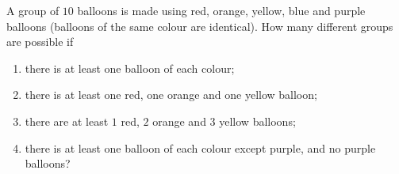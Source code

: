 A group of $10$ balloons is made using red, orange, yellow, blue and purple balloons (balloons of the same colour are identical). How many different groups are possible if
\begin{enumerate}
\item[(a)] there is at least one balloon of each colour;
\item[(b)] there is at least one red, one orange and one yellow balloon;
\item[(c)] there are at least $1$ red, $2$ orange and $3$ yellow balloons;
\item[(d)] there is at least one balloon of each colour except purple, and no purple balloons?
\end{enumerate}
